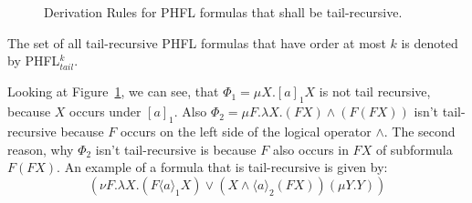 \begin{figure}
    \caption{Derivation Rules for PHFL formulas that shall be tail-recursive.}
    \label{figure:phfl-tail-recursive}
\end{figure}

The set of all tail-recursive PHFL formulas that have order at most $k$ is denoted by PHFL$^k_{tail}$.

\begin{example}{\cite{lange2014capturing}}
    Looking at Figure~\ref{figure:phfl-tail-recursive}, we can see, that $\Phi_1 = \mu X.[a]_1 X$ is not tail
    recursive, because $X$ occurs under $[a]_1$. Also $\Phi_2 = \mu F .\lambda X. (F X) \wedge (F(F X))$
    isn't tail-recursive because $F$ occurs on the left side of the logical operator $\wedge$. The second reason, why
    $\Phi_2$ isn't tail-recursive is because $F$ also occurs in $F X$ of subformula $F (F X)$. An example of a
    formula that is tail-recursive is given by:
    \[(\nu F. \lambda X. (F \langle a \rangle_1 X) \vee (X \wedge \langle a \rangle_2 (F X)) (\mu Y.Y))\]
\end{example}
